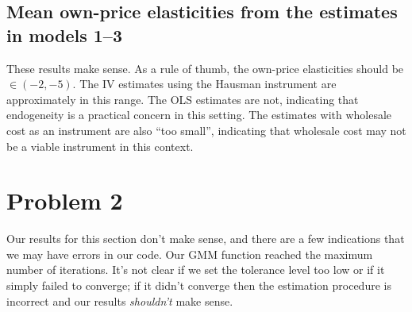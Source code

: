 \documentclass[dvipsnames]{article}
\begin{document}
\begin{table}[htp]
  \centering
  
  \end{table}

\newpage
\newpage
\subsection*{Mean own-price elasticities from the estimates in models 1--3}

\begin{table}[htp]
  \centering
  
  \end{table}

These results make sense. As a rule of thumb, the own-price elasticities should be $\in (-2, -5)$. The IV estimates using the Hausman instrument are approximately in this range. The OLS estimates are not, indicating that endogeneity is a practical concern in this setting. The estimates with wholesale cost as an instrument are also ``too small'', indicating that wholesale cost may not be a viable instrument in this context.

\newpage
\section*{Problem 2}
Our results for this section don't make sense, and there are a few indications that we may have errors in our code. Our GMM function reached the maximum number of iterations. It's not clear if we set the tolerance level too low or if it simply failed to converge; if it didn't converge then the estimation procedure is incorrect and our results \emph{shouldn't} make sense. 
\end{document}
